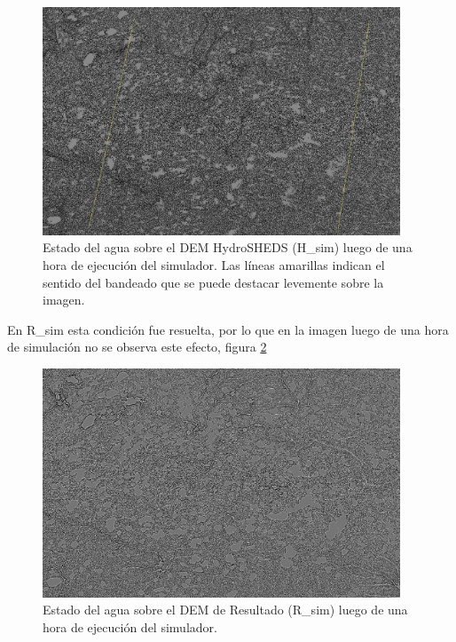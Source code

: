 \documentclass[10pt,a4paper, twoside]{report}
\begin{document}
\begin{figure}[H]
   \centering      
   \includegraphics[width=0.95\textwidth]{imagenes/ResultadoAguaBandeado.jpg}
 \caption{Estado del agua sobre el DEM HydroSHEDS (H\_sim) luego de una hora de ejecución del simulador. Las líneas amarillas indican el sentido del bandeado que se puede destacar levemente sobre la imagen.}
 \label{ResultadoAguaBandeado}
\end{figure}

En R\_sim esta condición fue resuelta, por lo que en la imagen luego de una hora de simulación no se observa este efecto, figura \ref{ResultadoAguaSinBandeado}


\begin{figure}[H]
   \centering      
   \includegraphics[width=0.95\textwidth]{imagenes/ResultadoAguaSinBandeado.jpg}
 \caption{Estado del agua sobre el DEM de Resultado (R\_sim) luego de una hora de ejecución del simulador.}
 \label{ResultadoAguaSinBandeado}
\end{figure}
\end{document}
